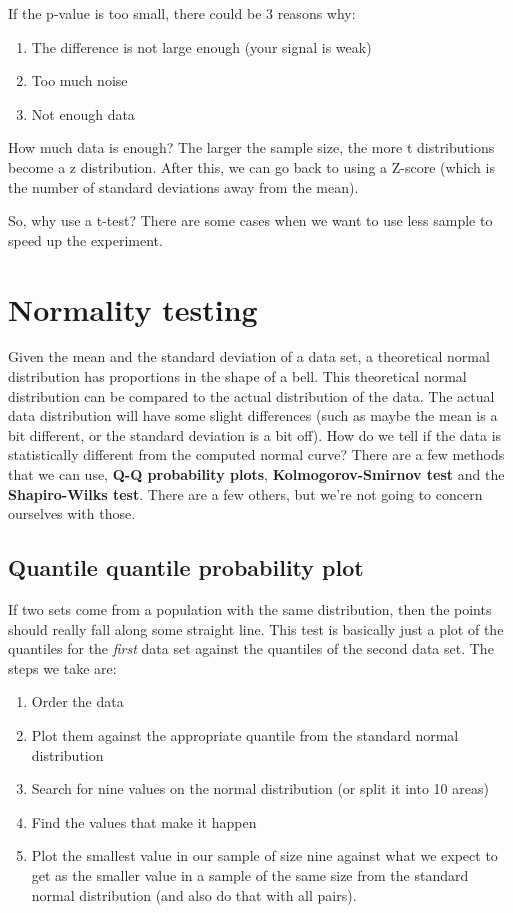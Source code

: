 \documentclass[11pt,a4paper,titlepage]{scrartcl}
\begin{document}
If the p-value is too small, there could be 3 reasons why:
\begin{enumerate}
    \item The difference is not large enough (your signal is weak)
    \item Too much noise
    \item Not enough data
\end{enumerate}

How much data is enough? The larger the sample size, the more
t distributions become a z distribution. After this, we can go back to
using a Z-score (which is the number of standard deviations away from the
mean).

So, why use a t-test? There are some cases when we want to use less sample
to speed up the experiment.

\section{Normality testing}%
\label{sec:normality}

Given the mean and the standard deviation of a data set, a theoretical
normal distribution has proportions in the shape of a bell. This
theoretical normal distribution can be compared to the actual distribution
of the data. The actual data distribution will have some slight
differences (such as maybe the mean is a bit different, or the standard
deviation is a bit off). How do we tell if the data is statistically
different from the computed normal curve? There are a few methods that we
can use, \textbf{Q-Q probability plots}, \textbf{Kolmogorov-Smirnov test}
and the \textbf{Shapiro-Wilks test}. There are a few others, but we're not
going to concern ourselves with those.

\subsection{Quantile quantile probability plot}%
\label{sub:q-q}

If two sets come from a population with the same distribution, then the
points should really fall along some straight line. This test is basically
just a plot of the quantiles for the \textit{first} data set against the
quantiles of the second data set. The steps we take are:
\begin{enumerate}
    \item Order the data
    \item Plot them against the appropriate quantile from the standard
        normal distribution
    \item Search for nine values on the normal distribution (or split it
        into 10 areas)
    \item Find the values that make it happen
    \item Plot the smallest value in our sample of size nine against what
        we expect to get as the smaller value in a sample of the same size
        from the standard normal distribution (and also do that with all
        pairs).
\end{enumerate}
\end{document}
